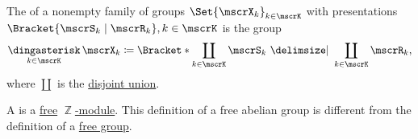 \begin{definition}\label{def:group_free_product}
  The  of a nonempty family of groups \( \Set{ \mscrX_k }_{k \in \mscrK} \) with presentations \( \Bracket{\mscrS_k \mid \mscrR_k}, k \in \mscrK \) is the group
  \begin{equation*}
    \Ast_{k \in \mscrK} \mscrX_k \coloneqq \Bracket*{ \coprod_{k \in \mscrK} \mscrS_k \Given \coprod_{k \in \mscrK} \mscrR_k },
  \end{equation*}
  where \( \coprod \) is the \hyperref[def:disjoint_union]{disjoint union}.
\end{definition}

\begin{definition}\label{def:free_abelian_group}
  A  is a \hyperref[def:free_left_module]{free} \hyperref[thm:abelian_group_iff_z_module]{\( \BbbZ \)-module}. This definition of a free abelian group is different from the definition of a \hyperref[def:free_group]{free group}.
\end{definition}
